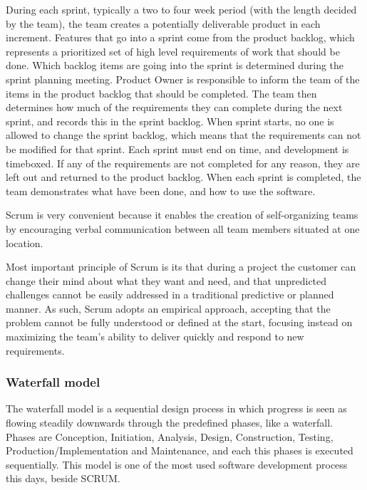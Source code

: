 During each sprint, typically a two to four week period (with the length decided by the team),
the team creates a potentially deliverable product in each increment.
Features that go into a sprint come from the product backlog,
which represents a prioritized set of high level requirements of work that should be done.
Which backlog items are going into the sprint is determined during the sprint planning meeting.
Product Owner is responsible to inform the team of the items in the product backlog that should be completed.
The team then determines how much of the requirements they can complete during the next sprint,
and records this in the sprint backlog.
When sprint starts, no one is allowed to change the sprint backlog, which means that the requirements
can not be modified for that sprint. Each sprint must end on time, and development is timeboxed.
If any of the requirements are not completed for any reason, they are left out and returned to the product backlog.
When each sprint is completed, the team demonstrates what have been done, and how to use the software.

Scrum is very convenient because it enables the creation of self-organizing teams by encouraging verbal communication between all team members situated at one location.

Most important principle of Scrum is its that during a project the customer can change their
mind about what they want and need, and that unpredicted challenges cannot be easily addressed
in a traditional predictive or planned manner.
As such, Scrum adopts an empirical approach, accepting that the problem cannot be fully understood
or defined at the start, focusing instead on maximizing the team’s ability to deliver quickly and
respond to new requirements.\cite{wiki:development-process}

\subsubsection{Waterfall model}
The waterfall model is a sequential design process in which progress is seen as flowing steadily downwards through the predefined phases, like a waterfall. Phases are Conception, Initiation, Analysis, Design, Construction, Testing, Production/Implementation and Maintenance, and each this phases is executed sequentially. This model is one of the most used software development process this days, beside SCRUM. 

